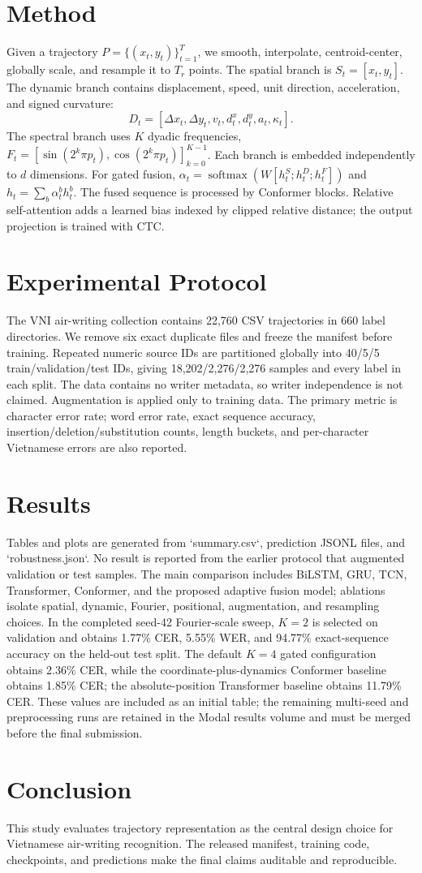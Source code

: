 \documentclass[runningheads]{llncs}
\begin{document}
\section{Method}
Given a trajectory $P=\{(x_t,y_t)\}_{t=1}^T$, we smooth, interpolate,
centroid-center, globally scale, and resample it to $T_r$ points. The spatial
branch is $S_t=[x_t,y_t]$. The dynamic branch contains displacement, speed,
unit direction, acceleration, and signed curvature:
\begin{equation}
D_t=[\Delta x_t,\Delta y_t,v_t,d^x_t,d^y_t,a_t,\kappa_t].
\end{equation}
The spectral branch uses $K$ dyadic frequencies,
$F_t=[\sin(2^k\pi p_t),\cos(2^k\pi p_t)]_{k=0}^{K-1}$.
Each branch is embedded independently to $d$ dimensions. For gated fusion,
$\alpha_t=\operatorname{softmax}(W[h^S_t;h^D_t;h^F_t])$ and
$h_t=\sum_b\alpha^b_t h^b_t$. The fused sequence is processed by Conformer
blocks. Relative self-attention adds a learned bias indexed by clipped
relative distance; the output projection is trained with CTC.

\section{Experimental Protocol}
The VNI air-writing collection contains 22,760 CSV trajectories in 660 label
directories. We remove six exact duplicate files and freeze the manifest
before training. Repeated numeric source IDs are partitioned globally into
40/5/5 train/validation/test IDs, giving 18,202/2,276/2,276 samples and every
label in each split. The data contains no writer metadata, so writer
independence is not claimed. Augmentation is applied only to training data.
The primary metric is character error rate; word error rate, exact sequence
accuracy, insertion/deletion/substitution counts, length buckets, and
per-character Vietnamese errors are also reported.

\section{Results}
Tables and plots are generated from `summary.csv`, prediction JSONL files,
and `robustness.json`. No result is reported from the earlier protocol that
augmented validation or test samples. The main comparison includes BiLSTM,
GRU, TCN, Transformer, Conformer, and the proposed adaptive fusion model;
ablations isolate spatial, dynamic, Fourier, positional, augmentation, and
resampling choices. In the completed seed-42 Fourier-scale sweep, $K=2$ is
selected on validation and obtains 1.77\% CER, 5.55\% WER, and 94.77\%
exact-sequence accuracy on the held-out test split. The default $K=4$ gated
configuration obtains 2.36\% CER, while the coordinate-plus-dynamics
Conformer baseline obtains 1.85\% CER; the absolute-position Transformer
baseline obtains 11.79\% CER. These values are included as an
initial table; the remaining multi-seed and preprocessing runs are retained
in the Modal results volume and must be merged before the final submission.

\section{Conclusion}
This study evaluates trajectory representation as the central design choice
for Vietnamese air-writing recognition. The released manifest, training code,
checkpoints, and predictions make the final claims auditable and reproducible.
\end{document}
